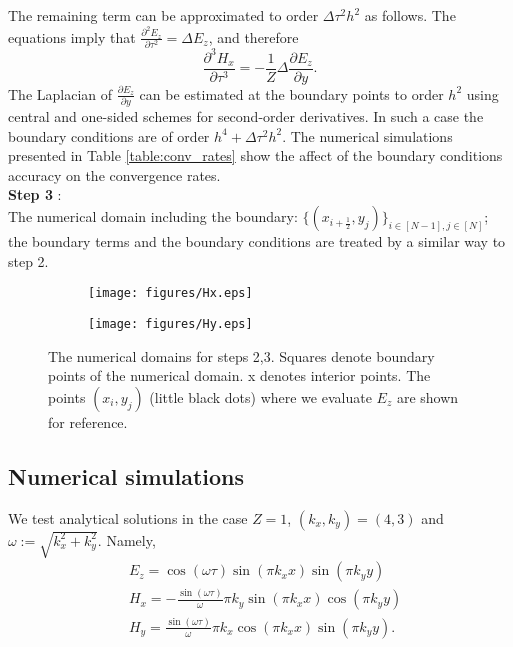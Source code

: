 \documentclass[12pt,reqno]{amsart}
\theoremstyle{definition}
\numberwithin{equation}{section}
\begin{document}
	The remaining term 
	can be  approximated to order $\Delta \tau^2 h^2$ as follows.
	The equations imply that   $\frac{\partial^2E_z}{\partial \tau^2}=\Delta E_z$, and therefore
	$$
	\frac{\partial^3 H_x}{\partial \tau^3}=
	-\frac{1}{Z}\Delta \frac{\partial E_z }{\partial y}.
	$$
	The Laplacian of $\frac{\partial E_z }{\partial y}$ can be estimated at the boundary points  to order $h^2$ using central and one-sided schemes for second-order derivatives.
	In such a case the boundary conditions are of order $h^4+\Delta \tau^2h^2.$
	The numerical simulations   presented in  Table \ref{table:conv_rates} show the affect of the boundary conditions accuracy on the convergence rates.\\[1mm]
	{\bf Step 3} : \\The numerical domain including the boundary: $\{(x_{i+\frac{1}{2}},y_{j})\}_{i\in [N-1],j\in [N]}$; the boundary terms and the boundary conditions are treated by a similar way to step 2.
	
	\begin{figure}[!t]
		\centering
		\begin{subfigure}[h]{0.4\textwidth}
			\texttt{[image: figures/Hx.eps]}
		\end{subfigure}
		\begin{subfigure}[h]{0.4\textwidth}
			\texttt{[image: figures/Hy.eps]}
		\end{subfigure}
		\caption{The numerical domains for steps 2,3.
			Squares denote boundary points of the numerical domain. x denotes interior points. The points $(x_i,y_j)$ (little black dots) where we evaluate $E_z$ are shown for reference.}
		\label{fig:Hx}
		
	\end{figure}
	\subsection{Numerical simulations}
	We test analytical solutions in the case $Z=1$,  
	$(k_x,k_y)=(4,3)$ and $\omega:=\sqrt{k_x^2+k_y^2}$.
	Namely, 
	\begin{align*}
		&
		E_z=\cos(\omega \tau)
		\sin{\left( \pi  k_x x\right) } \sin{\left( \pi  k_y y\right) }
		\\ &
		H_x=-\frac{\sin( \omega \tau)}{\omega}
		\pi k_y \sin( \pi  k_x x)
		\cos{\left( \pi  k_y y\right) } \\&
		H_y=\frac{\sin\left( \omega \tau\right) }{\omega} \pi  k_x \cos{\left( \pi  k_x x\right) } \sin{\left( \pi  k_y y\right) }. \\&
	\end{align*}
	
\end{document}
